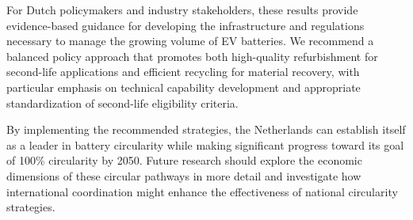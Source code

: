 For Dutch policymakers and industry stakeholders, these results provide evidence-based guidance for developing the infrastructure and regulations necessary to manage the growing volume of EV batteries. We recommend a balanced policy approach that promotes both high-quality refurbishment for second-life applications and efficient recycling for material recovery, with particular emphasis on technical capability development and appropriate standardization of second-life eligibility criteria.

By implementing the recommended strategies, the Netherlands can establish itself as a leader in battery circularity while making significant progress toward its goal of 100\% circularity by 2050. Future research should explore the economic dimensions of these circular pathways in more detail and investigate how international coordination might enhance the effectiveness of national circularity strategies.